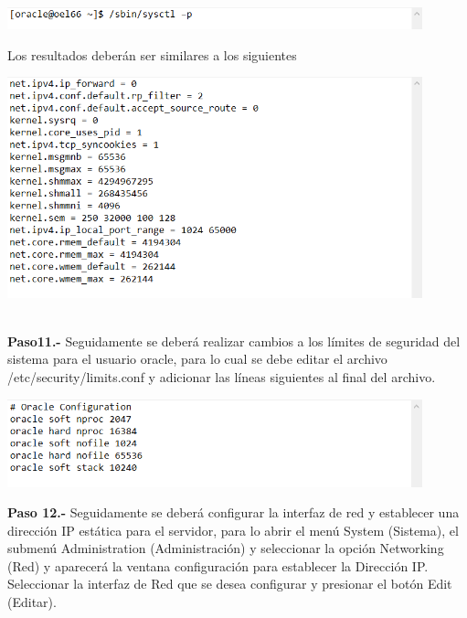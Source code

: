 \begin{enumerate}
\begin{center}
  \includegraphics[width=12cm]{Imagenes/Oracle_Database/Paso_10.png}
\end{center}
Los resultados deberán ser similares a los siguientes
\begin{center}
  \includegraphics[width=12cm]{Imagenes/Oracle_Database/Paso_10_2.png}
\end{center}

\vspace{12pt}\\

\textbf {Paso11.-} Seguidamente se deberá realizar cambios a los límites de seguridad del sistema para el usuario oracle, para lo cual se debe editar el archivo /etc/security/limits.conf y adicionar las líneas siguientes al final del archivo.

\begin{center}
  \includegraphics[width=12cm]{Imagenes/Oracle_Database/Paso_11.png}
\end{center}
\break

\textbf {Paso 12.-} Seguidamente se deberá configurar la interfaz de red y establecer una dirección IP estática para el servidor, para lo abrir el menú System (Sistema), el submenú Administration (Administración) y seleccionar la opción Networking (Red) y aparecerá la ventana configuración para establecer la Dirección IP. Seleccionar la interfaz de Red que se desea configurar y presionar el botón Edit (Editar).


\end{enumerate}
